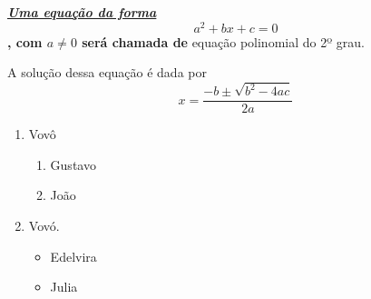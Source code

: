\documentclass[a4paper,12pt]{article}
\begin{document}
\textbf{\textit{\underline{Uma equação da forma}} $$a^2 + bx + c = 0$$, com $a \neq 0$ será chamada de} equação polinomial do 2º grau.

A solução dessa equação é dada por
$$x = \frac{-b \pm \sqrt{b^2 - 4ac}}{2a}$$

\begin{enumerate}
\item Vov\^ o 
\begin{enumerate}
\item Gustavo
\item João
\end{enumerate}
\item Vov\' o.
\begin{itemize}
\item Edelvira
\item Julia
\end{itemize}
\end{enumerate}
\end{document}
